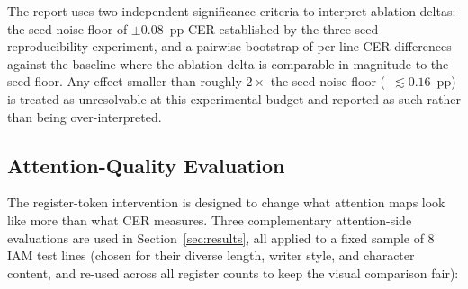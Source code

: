 The report uses two independent significance criteria to interpret ablation deltas: the seed-noise floor of $\pm 0.08$~pp CER established by the three-seed reproducibility experiment, and a pairwise bootstrap of per-line CER differences against the baseline where the ablation-delta is comparable in magnitude to the seed floor. Any effect smaller than roughly $2 \times$ the seed-noise floor (\ie\ $\lesssim 0.16$~pp) is treated as unresolvable at this experimental budget and reported as such rather than being over-interpreted.

\subsection{Attention-Quality Evaluation}
\label{sec:attn_eval}

The register-token intervention is designed to change what attention maps look like more than what CER measures. Three complementary attention-side evaluations are used in Section~\ref{sec:results}, all applied to a fixed sample of $8$ IAM test lines (chosen for their diverse length, writer style, and character content, and re-used across all register counts to keep the visual comparison fair):

